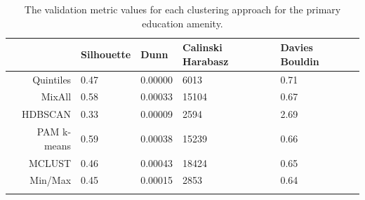 \documentclass[11pt, a4paper]{article}
\begin{document}
\begin{table}[H]
\centering
\caption[Number of clusters by approach]{The number of clusters suggested by all approaches for each amenity in the PMD.}\label{numclusts}
\end{table}












\begin{longtable}[H]{|r|llll|}
  \hline
 & Silhouette & Dunn & Calinski Harabasz & Davies Bouldin \\ 
  \hline
Quintiles & 0.47 & 0.00000 &  6013 & 0.71 \\ 
   \hline
MixAll & 0.58 & 0.00033 & 15104 & 0.67 \\ 
   \hline
HDBSCAN & 0.33 & 0.00009 &  2594 & 2.69 \\ 
   \hline
PAM k-means & 0.59 & 0.00038 & 15239 & 0.66 \\ 
   \hline
MCLUST & 0.46 & 0.00043 & 18424 & 0.65 \\ 
   \hline
Min/Max & 0.45 & 0.00015 &  2853 & 0.64 \\ 
   \hline
\caption[Primary education validation metrics]{ The validation metric values for each clustering approach for the primary education amenity.}\label{prieducmetrics} 
\end{longtable}
\end{document}
